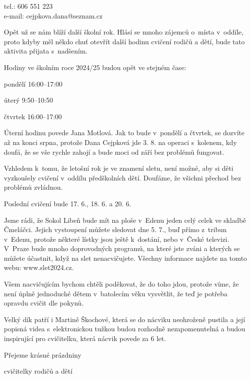 \documentclass[11pt]{article}
\begin{document}
\signature{Dana Cejpková}{tel.: 606 551 223\\e-mail: cejpkova.dana@seznam.cz}

\vspace*{24pt}

\clearpage
{}
Opět už se nám blíží další školní rok. Hlásí se mnoho zájemců o~místa v~oddíle, proto kdyby měl někdo chuť otevřít další hodinu cvičení rodičů a dětí, bude tato aktivita přijata s~nadšením.

Hodiny ve školním roce 2024/25 budou opět ve stejném čase:

\vspace*{6pt}
pondělí 16:00–17:00

úterý 9:50–10:50

čtvrtek 16:00–17:00
\vspace*{6pt}

Úterní hodinu povede Jana Motlová. Jak to bude v~pondělí a čtvrtek, se dozvíte až na konci srpna, protože Dana Cejpková jde 3. 8. na operaci s~kolenem, kdy doufá, že se vše rychle zahojí a bude moci od září bez problémů fungovat.

Vzhledem k~tomu, že letošní rok je ve znamení sletu, není možné, aby si děti vyzkoušely cvičení v~oddílu předškolních dětí. Doufáme, že všichni přechod bez problémů zvládnou.

Poslední cvičení bude 17. 6., 18. 6. a 20. 6.

Jsme rádi, že Sokol Libeň bude mít na ploše v~Edenu jeden celý celek ve skladbě Čmeláčci. Jejich vystoupení můžete sledovat dne 5. 7., buď přímo z~tribun v~Edenu, protože některé lístky jsou ještě k~dostání, nebo v~České televizi.
V~Praze bude mnoho doprovodných programů, na které jste zváni a kterých se můžete účastnit, když na slet nenacvičujete. Všechny informace najdete na tomto webu: www.slet2024.cz.

Všem nacvičujícím bychom chtěli poděkovat, že do toho jdou, protože víme, že není úplně jednoduché dětem v~batolecím věku vysvětlit, že teď je potřeba opravdu cvičit dle pokynů.

Velký dík patří i Martině Škochové, která se do nácviku neohroženě pustila a její popisná videa s~\luv{}elektronickou tužkou\ruv{} budou rozhodně nezapomenutelná a budou inspirující pro cvičitelku, která nácvik povede za 6 let.

Přejeme krásné prázdniny

\signature{Jana, Dana a Jana}{cvičitelky rodičů a dětí}
\end{document}
